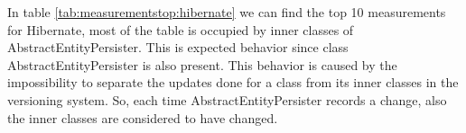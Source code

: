 \documentclass[12pt, a4paper, twoside]{report}
\begin{document}
In table \ref{tab:measurementstop:hibernate} we can find the top 10 measurements for Hibernate, most of the table is occupied by inner classes of AbstractEntityPersister. This is expected behavior since class AbstractEntityPersister is also present. This behavior is caused by the impossibility to separate the updates done for a class from its inner classes in the versioning system. So, each time AbstractEntityPersister records a change, also the inner classes are considered to have changed.
\begin{table}[!h]
\renewcommand{\arraystretch}{1}
\caption{Top 10 measurements for Ant. }
\label{tab:measurementstop:ant}
\centering
{}
\end{table}
\end{document}
